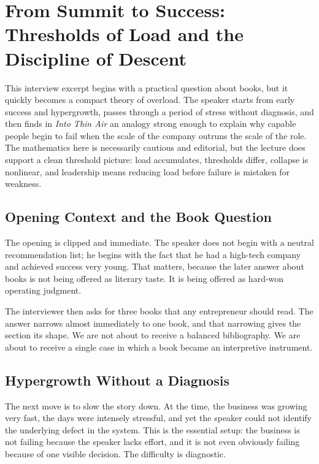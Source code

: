\chapter{From Summit to Success: Thresholds of Load and the Discipline of Descent}

This interview excerpt begins with a practical question about books, but it quickly becomes a compact theory of overload. The speaker starts from early success and hypergrowth, passes through a period of stress without diagnosis, and then finds in \emph{Into Thin Air} an analogy strong enough to explain why capable people begin to fail when the scale of the company outruns the scale of the role. The mathematics here is necessarily cautious and editorial, but the lecture does support a clean threshold picture: load accumulates, thresholds differ, collapse is nonlinear, and leadership means reducing load before failure is mistaken for weakness.

\section{Opening Context and the Book Question}

The opening is clipped and immediate. The speaker does not begin with a neutral recommendation list; he begins with the fact that he had a high-tech company and achieved success very young. That matters, because the later answer about books is not being offered as literary taste. It is being offered as hard-won operating judgment.

The interviewer then asks for three books that any entrepreneur should read. The answer narrows almost immediately to one book, and that narrowing gives the section its shape. We are not about to receive a balanced bibliography. We are about to receive a single case in which a book became an interpretive instrument.

\section{Hypergrowth Without a Diagnosis}

The next move is to slow the story down. At the time, the business was growing very fast, the days were intensely stressful, and yet the speaker could not identify the underlying defect in the system. This is the essential setup: the business is not failing because the speaker lacks effort, and it is not even obviously failing because of one visible decision. The difficulty is diagnostic.

